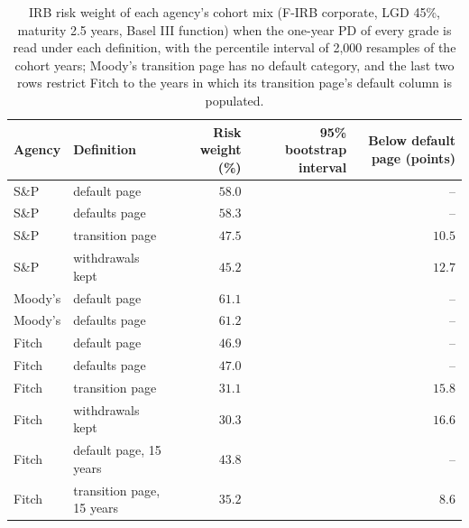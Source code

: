 \begin{table}[htbp]
\centering
\setlength{\tabcolsep}{3.5pt}
\footnotesize
\caption{IRB risk weight of each agency's cohort mix (F-IRB corporate, LGD 45\%, maturity 2.5 years, Basel III function) when the one-year PD of every grade is read under each definition, with the percentile interval of 2{,}000 resamples of the cohort years; Moody's transition page has no default category, and the last two rows restrict Fitch to the years in which its transition page's default column is populated.}
\label{tab:rw}
\begin{tabular}{llrrr}
\toprule
Agency & Definition & Risk weight (\%) & 95\% bootstrap interval & Below default page (points) \\
\midrule
\relax S\&P & \relax default page & $58.0$ & \relax [50.0, 65.4] & \relax -- \\
\relax S\&P & \relax defaults page & $58.3$ & \relax [50.3, 65.6] & \relax -- \\
\relax S\&P & \relax transition page & $47.5$ & \relax [40.0, 54.5] & $10.5$ \\
\relax S\&P & \relax withdrawals kept & $45.2$ & \relax [38.2, 52.1] & $12.7$ \\
\relax Moody's & \relax default page & $61.1$ & \relax [49.9, 71.8] & \relax -- \\
\relax Moody's & \relax defaults page & $61.2$ & \relax [50.0, 71.9] & \relax -- \\
\relax Fitch & \relax default page & $46.9$ & \relax [40.7, 56.1] & \relax -- \\
\relax Fitch & \relax defaults page & $47.0$ & \relax [40.9, 56.2] & \relax -- \\
\relax Fitch & \relax transition page & $31.1$ & \relax [26.2, 35.2] & $15.8$ \\
\relax Fitch & \relax withdrawals kept & $30.3$ & \relax [25.5, 34.3] & $16.6$ \\
\relax Fitch & \relax default page, 15 years & $43.8$ & \relax [39.5, 47.7] & \relax -- \\
\relax Fitch & \relax transition page, 15 years & $35.2$ & \relax [30.3, 39.9] & $8.6$ \\
\bottomrule
\end{tabular}
\end{table}
